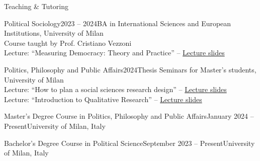 \documentclass{cv} %
\begin{document}
\begin{rSection}{Teaching \& Tutoring}

\subtitle{Guest Lectures}

\begin{rTeachingSection}{Political Sociology}{2023 -- 2024}{BA in International Sciences and European Institutions, University of Milan}\\ 
Course taught by Prof. Cristiano Vezzoni \\    
Lecture: “Measuring Democracy: Theory and Practice” -- \href{https://github.com/ste-sangiovanni/democracy_seminar}{Lecture slides}   
\end{rTeachingSection}
\begin{rTeachingSection}{Politics, Philosophy and Public Affairs}{2024}{Thesis Seminars for Master's students, University of Milan} \\ 
Lecture: “How to plan a social sciences research design” -- \href{https://github.com/ste-sangiovanni/PPPA_Thesis_Seminar}{Lecture slides}  \\ 
Lecture: “Introduction to Qualitative Research” -- \href{https://github.com/ste-sangiovanni/PPPA_Thesis_Seminar}{Lecture slides}   
\end{rTeachingSection}
    
\subtitle{Academic Tutoring \& Teaching Assistant}

\begin{rTeachingSection}{Master’s Degree Course in Politics, Philosophy and Public Affairs}{January 2024  -- Present}{University of Milan, Italy}
\end{rTeachingSection} 
\begin{rTeachingSection}{Bachelor’s Degree Course in Political Science}{September 2023 -- Present}{University of Milan, Italy}
\end{rTeachingSection} 
\end{rSection}
    
\newpage
\end{document}
